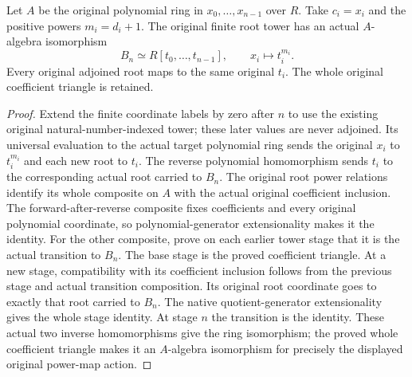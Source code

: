 \begin{lemma}
\label{lem:kn-nadel-kummer-tower-polynomial-iso}
\leanok
{}
Let $A$ be the original polynomial ring in $x_0,\ldots,x_{n-1}$
over $R$.  Take $c_i=x_i$ and the positive powers $m_i=d_i+1$.
The original finite root tower has an actual $A$-algebra isomorphism
\[
 B_n\simeq R[t_0,\ldots,t_{n-1}],\qquad x_i\longmapsto t_i^{m_i}.
\]
Every original adjoined root maps to the same original $t_i$.
The whole original coefficient triangle is retained.
\end{lemma}
\begin{proof}
Extend the finite coordinate labels by zero after $n$ to use the
existing original natural-number-indexed tower; these later values
are never adjoined.  Its universal evaluation to the actual target
polynomial ring sends the original $x_i$ to $t_i^{m_i}$ and each
new root to $t_i$.  The reverse polynomial homomorphism sends
$t_i$ to the corresponding actual root carried to $B_n$.
The original root power relations identify its whole composite
on $A$ with the actual original coefficient inclusion.
The forward-after-reverse composite fixes coefficients and every
original polynomial coordinate, so polynomial-generator
extensionality makes it the identity.  For the other composite,
prove on each earlier tower stage that it is the actual transition
to $B_n$.  The base stage is the proved coefficient triangle.
At a new stage, compatibility with its coefficient inclusion
follows from the previous stage and actual transition composition.
Its original root coordinate goes to exactly that root carried to
$B_n$.  The native quotient-generator extensionality gives the
whole stage identity.  At stage $n$ the transition is the identity.
These actual two inverse homomorphisms give the ring isomorphism;
the proved whole coefficient triangle makes it an $A$-algebra
isomorphism for precisely the displayed original power-map action.
\end{proof}


